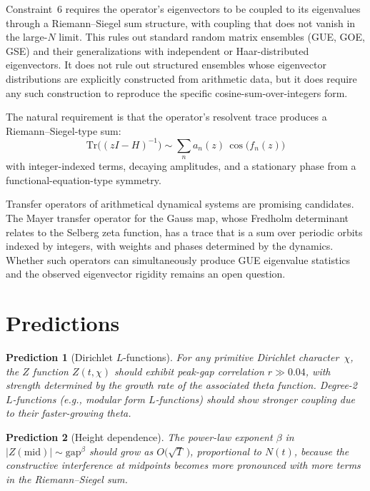 \documentclass[11pt,a4paper]{article}
\newtheorem{prediction}{Prediction}
\begin{document}
Constraint~6 requires the operator's eigenvectors to be coupled to its eigenvalues through a Riemann--Siegel sum structure, with coupling that does not vanish in the large-$N$ limit.
This rules out standard random matrix ensembles (GUE, GOE, GSE) and their generalizations with independent or Haar-distributed eigenvectors.
It does not rule out structured ensembles whose eigenvector distributions are explicitly constructed from arithmetic data, but it does require any such construction to reproduce the specific cosine-sum-over-integers form.

The natural requirement is that the operator's resolvent trace produces a Riemann--Siegel-type sum:
\begin{equation}\label{eq:resolvent}
\mathrm{Tr}\bigl((zI - H)^{-1}\bigr) \sim \sum_n a_n(z)\,\cos\!\bigl(f_n(z)\bigr)
\end{equation}
with integer-indexed terms, decaying amplitudes, and a stationary phase from a functional-equation-type symmetry.

Transfer operators of arithmetical dynamical systems are promising candidates.
The Mayer transfer operator for the Gauss map, whose Fredholm determinant relates to the Selberg zeta function, has a trace that is a sum over periodic orbits indexed by integers, with weights and phases determined by the dynamics.
Whether such operators can simultaneously produce GUE eigenvalue statistics and the observed eigenvector rigidity remains an open question.

\section{Predictions}

\begin{prediction}[Dirichlet $L$-functions]
For any primitive Dirichlet character~$\chi$, the $Z$ function $Z(t,\chi)$ should exhibit peak-gap correlation $r \gg 0.04$, with strength determined by the growth rate of the associated theta function.
Degree-2 $L$-functions (e.g., modular form $L$-functions) should show stronger coupling due to their faster-growing theta.
\end{prediction}

\begin{prediction}[Height dependence]
The power-law exponent $\beta$ in $|Z(\mathrm{mid})| \sim \mathrm{gap}^\beta$ should grow as $O\!\bigl(\!\sqrt{T}\,\bigr)$, proportional to $N(t)$, because the constructive interference at midpoints becomes more pronounced with more terms in the Riemann--Siegel sum.
\end{prediction}
\end{document}
